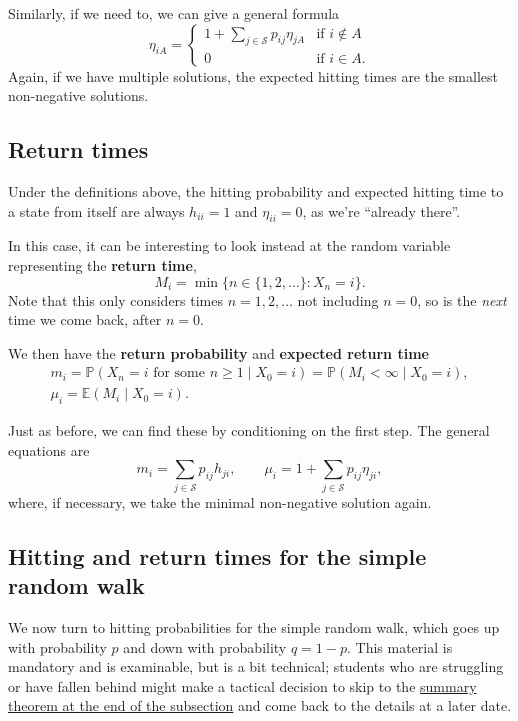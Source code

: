 \documentclass[
  a4paper,
]{article}
\theoremstyle{definition}
\theoremstyle{definition}
\theoremstyle{definition}
\theoremstyle{remark}
\begin{document}
Similarly, if we need to, we can give a general formula
\[ \eta_{iA} = \begin{cases} 1 + \displaystyle\sum_{j \in \mathcal S} p_{ij} \eta_{jA} & \text{if $i \not\in A$} \\
0 & \text{if $i \in A$.} \end{cases} \]
Again, if we have multiple solutions, the expected hitting times are the smallest non-negative solutions.

\hypertarget{return-times}{%
\subsection{Return times}\label{return-times}}

Under the definitions above, the hitting probability and expected hitting time to a state from itself are always \(h_{ii} = 1\) and \(\eta_{ii} = 0\), as we're ``already there''.

In this case, it can be interesting to look instead at the random variable representing the \textbf{return time},
\[ M_i = \min \big\{n \in \{1,2,\dots\} : X_n = i  \big\} . \]
Note that this only considers times \(n = 1, 2, \dots\) not including \(n = 0\), so is the \emph{next} time we come back, after \(n = 0\).

We then have the \textbf{return probability} and \textbf{expected return time}
\begin{gather*} m_{i} = \mathbb P(X_n = i  \text{ for some $n \geq 1$} \mid X_0 = i) = \mathbb P(M_i < \infty \mid X_0 = i) ,  \\
 \mu_{i} = \mathbb E(M_i \mid X_0 = i) .  \end{gather*}

Just as before, we can find these by conditioning on the first step. The general equations are
\[
      m_i = \sum_{j \in \mathcal S} p_{ij}h_{ji} , \qquad
      \mu_i = 1 + \sum_{j \in \mathcal S} p_{ij}\eta_{ji},
  \]
where, if necessary, we take the minimal non-negative solution again.

\hypertarget{return-rw}{%
\subsection{Hitting and return times for the simple random walk}\label{return-rw}}

We now turn to hitting probabilities for the simple random walk, which goes up with probability \(p\) and down with probability \(q = 1-p\). This material is mandatory and is examinable, but is a bit technical; students who are struggling or have fallen behind might make a tactical decision to skip to the \protect\hyperlink{thm:rw-summary}{summary theorem at the end of the subsection} and come back to the details at a later date.
\end{document}
